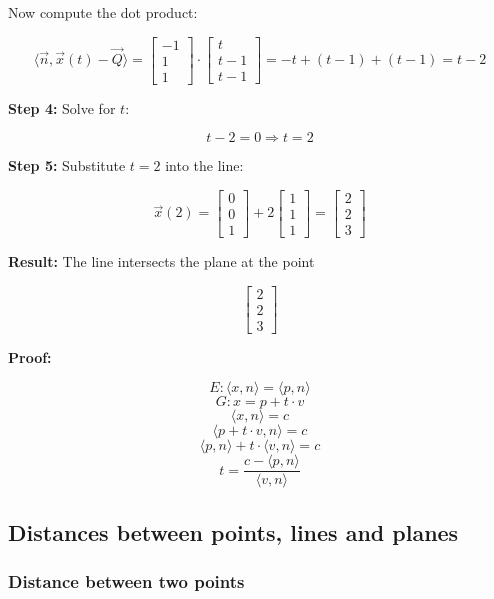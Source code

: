 Now compute the dot product:

\[
	\langle \vec{n}, \vec{x}(t) - \vec{Q} \rangle =
	\begin{bmatrix} -1 \\ 1 \\ 1 \end{bmatrix} \cdot \begin{bmatrix} t \\ t - 1 \\ t - 1 \end{bmatrix}
	= -t + (t - 1) + (t - 1) = t - 2
\]

\textbf{Step 4:} Solve for \(t\):

\[
	t - 2 = 0 \Rightarrow t = 2
\]

\textbf{Step 5:} Substitute \( t = 2 \) into the line:

\[
	\vec{x}(2) = \begin{bmatrix} 0 \\ 0 \\ 1 \end{bmatrix} + 2 \begin{bmatrix} 1 \\ 1 \\ 1 \end{bmatrix} =
	\begin{bmatrix} 2 \\ 2 \\ 3 \end{bmatrix}
\]

\textbf{Result:} The line intersects the plane at the point

\[
	\begin{bmatrix} 2 \\ 2 \\ 3 \end{bmatrix}
\]

\textbf{Proof:}

\[
	E: \langle x, n\rangle = \langle p, n \rangle
\]
\[
	G: x = p + t \cdot v
\]
\[
	\langle x, n \rangle = c
\]
\[
	\langle p + t \cdot v, n \rangle = c
\]
\[
	\langle p, n \rangle + t \cdot \langle v, n \rangle = c
\]
\[
	t = \frac{c - \langle p, n \rangle}{\langle v, n \rangle}
\]
\QED

\subsection{Distances between points, lines and planes}

\subsubsection{Distance between two points}


